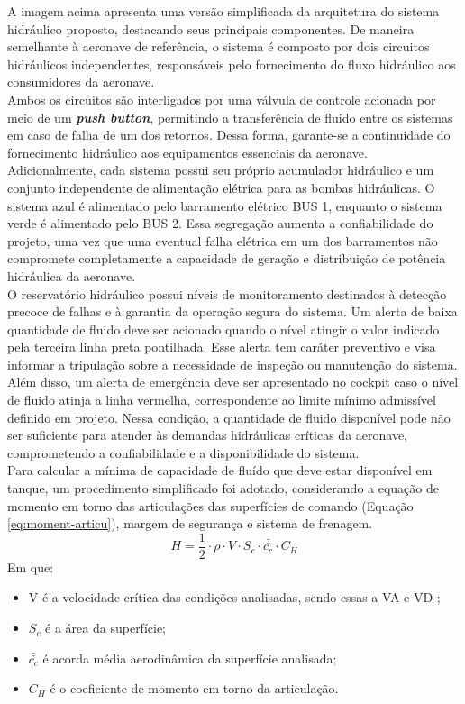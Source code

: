 A imagem acima apresenta uma versão simplificada da arquitetura do sistema hidráulico proposto, destacando seus principais componentes. De maneira semelhante à aeronave de referência, o sistema é composto por dois circuitos hidráulicos independentes, responsáveis pelo fornecimento do fluxo hidráulico aos consumidores da aeronave.\\
Ambos os circuitos são interligados por uma válvula de controle acionada por meio de um \textit{\textbf{push button}}, permitindo a transferência de fluido entre os sistemas em caso de falha de um dos retornos. Dessa forma, garante-se a continuidade do fornecimento hidráulico aos equipamentos essenciais da aeronave.\\
Adicionalmente, cada sistema possui seu próprio acumulador hidráulico e um conjunto independente de alimentação elétrica para as bombas hidráulicas. O sistema azul é alimentado pelo barramento elétrico BUS 1, enquanto o sistema verde é alimentado pelo BUS 2. Essa segregação aumenta a confiabilidade do projeto, uma vez que uma eventual falha elétrica em um dos barramentos não compromete completamente a capacidade de geração e distribuição de potência hidráulica da aeronave.\\
O reservatório hidráulico possui níveis de monitoramento destinados à detecção precoce de falhas e à garantia da operação segura do sistema. Um alerta de baixa quantidade de fluido deve ser acionado quando o nível atingir o valor indicado pela terceira linha preta pontilhada. Esse alerta tem caráter preventivo e visa informar a tripulação sobre a necessidade de inspeção ou manutenção do sistema.\\
Além disso, um alerta de emergência deve ser apresentado no cockpit caso o nível de fluido atinja a linha vermelha, correspondente ao limite mínimo admissível definido em projeto. Nessa condição, a quantidade de fluido disponível pode não ser suficiente para atender às demandas hidráulicas críticas da aeronave, comprometendo a confiabilidade e a disponibilidade do sistema. \\
Para calcular a  mínima de capacidade de fluído que deve estar disponível em tanque, um procedimento simplificado foi adotado, considerando a equação de momento em torno das articulações das superfícies de comando (Equação \ref{eq:moment-articu}), margem de segurança e sistema de frenagem.
\begin{equation}
    H = \frac{1}{2} \cdot \rho \cdot V \cdot S_c \cdot \bar{\bar{c_c}} \cdot C_H
    \label{eq:moment-articu}
\end{equation}
Em que:
\begin{itemize}
    \item V é a velocidade crítica das condições analisadas, sendo essas a VA e VD ;
    \item $S_c$ é a área da superfície;
    \item $\bar{\bar{c_c}}$ é  acorda média aerodinâmica da superfície analisada;
    \item $C_H$ é o coeficiente de momento em torno da articulação.
\end{itemize}

